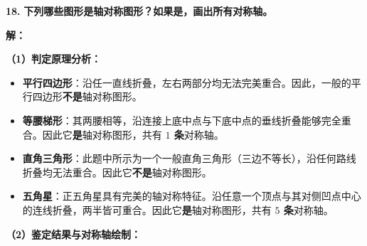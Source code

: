\textbf{\LARGE 18.} \textbf{下列哪些图形是轴对称图形？如果是，画出所有对称轴。}

\vspace{0.4cm}
\textbf{解：}

\textbf{（1）判定原理分析：}
\begin{itemize}
    \item \textbf{平行四边形}：沿任一直线折叠，左右两部分均无法完美重合。因此，一般的平行四边形\textbf{不是}轴对称图形。
    \item \textbf{等腰梯形}：其两腰相等，沿连接上底中点与下底中点的垂线折叠能够完全重合。因此它\textbf{是}轴对称图形，共有 \textbf{$1$ 条}对称轴。
    \item \textbf{直角三角形}：此题中所示为一个一般直角三角形（三边不等长），沿任何路线折叠均无法重合。因此它\textbf{不是}轴对称图形。
    \item \textbf{五角星}：正五角星具有完美的轴对称特征。沿任意一个顶点与其对侧凹点中心的连线折叠，两半皆可重合。因此它\textbf{是}轴对称图形，共有 \textbf{$5$ 条}对称轴。
\end{itemize}

\textbf{（2）鉴定结果与对称轴绘制：}

